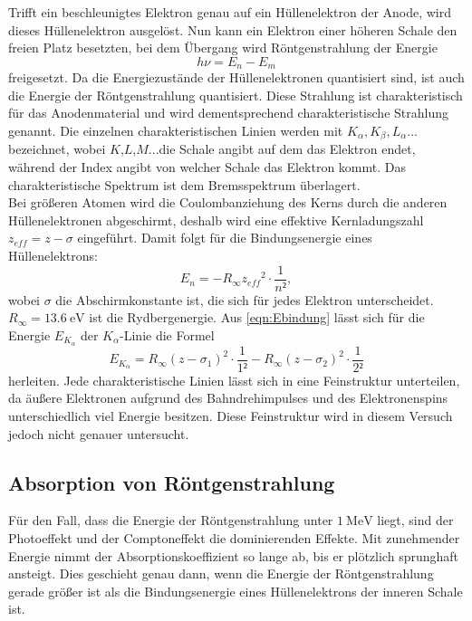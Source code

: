 Trifft ein beschleunigtes Elektron genau auf ein Hüllenelektron der Anode,
wird dieses Hüllenelektron ausgelöst. Nun kann ein Elektron einer höheren Schale den
freien Platz besetzten, bei dem Übergang wird Röntgenstrahlung der Energie
\begin{equation}
  h \nu=E_n -E_m
\end{equation}
freigesetzt. Da die Energiezustände der Hüllenelektronen quantisiert sind, ist auch die
Energie der Röntgenstrahlung quantisiert. Diese Strahlung ist charakteristisch für das
Anodenmaterial und wird dementsprechend charakteristische Strahlung genannt.
Die einzelnen charakteristischen Linien werden mit $K_{\alpha}, K_{\beta}, L_{\alpha}...$
bezeichnet, wobei $K$,$L$,$M$...die Schale angibt auf dem das Elektron endet, während
der Index angibt von welcher Schale das Elektron kommt. Das charakteristische Spektrum
ist dem Bremsspektrum überlagert.\\

Bei größeren Atomen wird die Coulombanziehung des Kerns durch die anderen Hüllenelektronen
abgeschirmt, deshalb wird eine effektive Kernladungszahl $z_{eff}=z-\sigma$
eingeführt. Damit folgt für die Bindungsenergie eines Hüllenelektrons:
\begin{equation}
  E_n= -R_{\infty}{z_{eff}}^{2}\cdot \frac{1}{n²},
  \label{eqn:Ebindung}
\end{equation}
wobei $\sigma$ die Abschirmkonstante ist, die sich für jedes Elektron unterscheidet.
$R_{\infty}=\SI{13.6}{\eV}$ ist die Rydbergenergie.
Aus \ref{eqn:Ebindung} lässt sich für die Energie $E_{K_{\alpha}}$ der $K_{\alpha}$-Linie
die Formel
\begin{equation}
  E_{K_{\alpha}}=R_{\infty}(z-\sigma_{1})^{2}\cdot\frac{1}{1²}-R_{\infty}(z-\sigma_{2})^{2}\cdot\frac{1}{2²}
  \label{eqn:k}
\end{equation}
herleiten.
Jede charakteristische Linien lässt sich in eine Feinstruktur unterteilen, da
äußere Elektronen aufgrund des Bahndrehimpulses und des Elektronenspins unterschiedlich
viel Energie besitzen. Diese Feinstruktur wird in diesem Versuch jedoch nicht genauer
untersucht.

\subsection{Absorption von Röntgenstrahlung}
Für den Fall, dass die Energie der Röntgenstrahlung unter $\SI{1}{\mega\electronvolt}$ liegt,
sind der Photoeffekt und der Comptoneffekt die dominierenden Effekte.
Mit zunehmender Energie nimmt der Absorptionskoeffizient so lange ab, bis
er plötzlich sprunghaft ansteigt. Dies geschieht genau dann, wenn die Energie der
Röntgenstrahlung gerade größer ist als die Bindungsenergie eines Hüllenelektrons
der inneren Schale ist.

